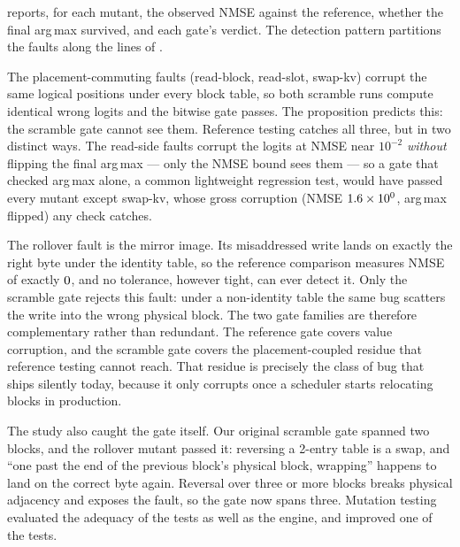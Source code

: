 \documentclass[sigconf,nonacm,screen]{acmart}
\begin{document}
 reports, for each mutant, the observed NMSE against the
reference, whether the final arg\,max survived, and each gate's verdict.
The detection pattern partitions the faults along the lines of
.

The placement-commuting faults (read-block, read-slot, swap-kv) corrupt the
same logical positions under every block table, so both scramble runs
compute identical wrong logits and the bitwise gate passes. The proposition
predicts this: the scramble gate cannot see them. Reference testing catches
all three, but in two distinct ways. The read-side faults corrupt the
logits at NMSE near $10^{-2}$ \emph{without} flipping the final arg\,max
--- only the NMSE bound sees them --- so a gate that checked arg\,max
alone, a common lightweight regression test, would have passed every
mutant except swap-kv, whose gross corruption (NMSE
$1.6\times 10^{0}$, arg\,max flipped) any check catches.

The rollover fault is the mirror image. Its misaddressed write lands on
exactly the right byte under the identity table, so the reference comparison
measures NMSE of exactly $0$, and no tolerance, however
tight, can ever detect it. Only the scramble gate rejects this fault: under
a non-identity table the same bug scatters the write into the wrong physical
block. The two gate families are therefore complementary rather than
redundant. The reference gate covers value corruption, and the scramble gate
covers the placement-coupled residue that reference testing cannot reach.
That residue is precisely the class of bug that ships silently today,
because it only corrupts once a scheduler starts relocating blocks in
production.

The study also caught the gate itself. Our original scramble gate spanned
two blocks, and the rollover mutant passed it: reversing a 2-entry table is
a swap, and ``one past the end of the previous block's physical block,
wrapping'' happens to land on the correct byte again. Reversal over three or
more blocks breaks physical adjacency and exposes the fault, so the gate now
spans three. Mutation testing evaluated the adequacy of the tests as well as
the engine, and improved one of the tests.
\end{document}
